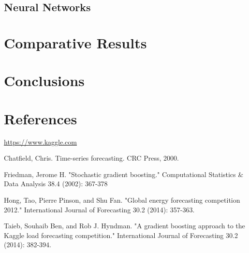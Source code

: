 \documentclass{article} %
\begin{document}
\subsection*{Neural Networks}

\section*{Comparative Results}

\section*{Conclusions}


\section*{References}
\url{https://www.kaggle.com}


Chatfield, Chris. Time-series forecasting. CRC Press, 2000.

Friedman, Jerome H. "Stochastic gradient boosting." Computational Statistics \& Data Analysis 38.4 (2002): 367-378

Hong, Tao, Pierre Pinson, and Shu Fan. "Global energy forecasting competition 2012." International Journal of Forecasting 30.2 (2014): 357-363.

Taieb, Souhaib Ben, and Rob J. Hyndman. "A gradient boosting approach to the Kaggle load forecasting competition." International Journal of Forecasting 30.2 (2014): 382-394.
\end{document}

